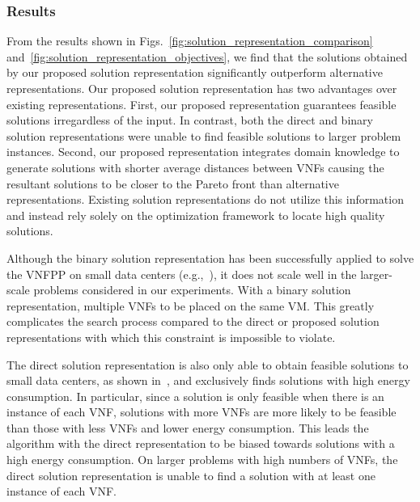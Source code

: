 \subsubsection{Results}
From the results shown in Figs.~\ref{fig:solution_representation_comparison} and~\ref{fig:solution_representation_objectives}, we find that the solutions obtained by our proposed solution representation significantly outperform alternative representations. Our proposed solution representation has two advantages over existing representations. First, our proposed representation guarantees feasible solutions irregardless of the input. In contrast, both the direct and binary solution representations were unable to find feasible solutions to larger problem instances. Second, our proposed representation integrates domain knowledge to generate solutions with shorter average distances between VNFs causing the resultant solutions to be closer to the Pareto front than alternative representations. Existing solution representations do not utilize this information and instead rely solely on the optimization framework to locate high quality solutions.

Although the binary solution representation has been successfully applied to solve the VNFPP on small data centers (e.g.,~\cite{ChantreF20,KaurGK020,CharismiadisTPM20}), it does not scale well in the larger-scale problems considered in our experiments. With a binary solution representation, multiple VNFs to be placed on the same VM. This greatly complicates the search process compared to the direct or proposed solution representations with which this constraint is impossible to violate.

The direct solution representation is also only able to obtain feasible solutions to small data centers, as shown in~, and exclusively finds solutions with high energy consumption. In particular, since a solution is only feasible when there is an instance of each VNF, solutions with more VNFs are more likely to be feasible than those with less VNFs and lower energy consumption. This leads the algorithm with the direct representation to be biased towards solutions with a high energy consumption. On larger problems with high numbers of VNFs, the direct solution representation is unable to find a solution with at least one instance of each VNF.

\vspace{0.5em}
\noindent
{}

